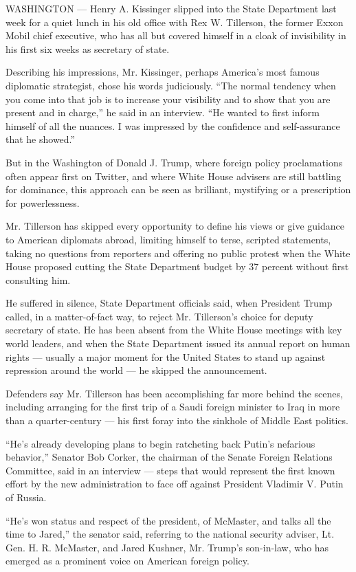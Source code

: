 WASHINGTON --- Henry A. Kissinger slipped into the State Department last
week for a quiet lunch in his old office with Rex W. Tillerson, the
former Exxon Mobil chief executive, who has all but covered himself in a
cloak of invisibility in his first six weeks as secretary of state.

Describing his impressions, Mr. Kissinger, perhaps America's most famous
diplomatic strategist, chose his words judiciously. ``The normal
tendency when you come into that job is to increase your visibility and
to show that you are present and in charge,'' he said in an interview.
``He wanted to first inform himself of all the nuances. I was impressed
by the confidence and self-assurance that he showed.''

But in the Washington of Donald J. Trump, where foreign policy
proclamations often appear first on Twitter, and where White House
advisers are still battling for dominance, this approach can be seen as
brilliant, mystifying or a prescription for powerlessness.

Mr. Tillerson has skipped every opportunity to define his views or give
guidance to American diplomats abroad, limiting himself to terse,
scripted statements, taking no questions from reporters and offering no
public protest when the White House proposed cutting the State
Department budget by 37 percent without first consulting him.

He suffered in silence, State Department officials said, when President
Trump called, in a matter-of-fact way, to reject Mr. Tillerson's choice
for deputy secretary of state. He has been absent from the White House
meetings with key world leaders, and when the State Department issued
its annual report on human rights --- usually a major moment for the
United States to stand up against repression around the world --- he
skipped the announcement.

Defenders say Mr. Tillerson has been accomplishing far more behind the
scenes, including arranging for the first trip of a Saudi foreign
minister to Iraq in more than a quarter-century --- his first foray into
the sinkhole of Middle East politics.

``He's already developing plans to begin ratcheting back Putin's
nefarious behavior,'' Senator Bob Corker, the chairman of the Senate
Foreign Relations Committee, said in an interview --- steps that would
represent the first known effort by the new administration to face off
against President Vladimir V. Putin of Russia.

``He's won status and respect of the president, of McMaster, and talks
all the time to Jared,'' the senator said, referring to the national
security adviser, Lt. Gen. H. R. McMaster, and Jared Kushner, Mr.
Trump's son-in-law, who has emerged as a prominent voice on American
foreign policy.


